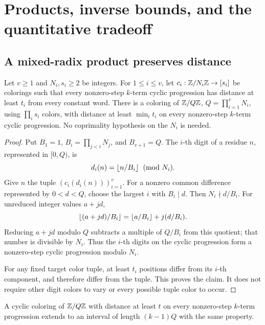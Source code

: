 \section{Products, inverse bounds, and the quantitative tradeoff}
\label{sec:consequences}

\subsection{A mixed-radix product preserves distance}

\begin{proposition}\label{prop:product}
Let \(v\ge1\) and \(N_i,s_i\ge2\) be integers.
For \(1\le i\le v\), let \(c_i:\mathbb Z/N_i\mathbb Z\to[s_i]\) be colorings
such that every nonzero-step \(k\)-term cyclic progression has
distance at least \(t_i\) from every constant word.
There is a coloring of \(\mathbb Z/Q\mathbb Z\), \(Q=\prod_{i=1}^vN_i\),
using \(\prod_i s_i\) colors, with distance at least
\(\min_i t_i\) on every nonzero-step \(k\)-term cyclic progression.
No coprimality hypothesis on the \(N_i\) is needed.
\end{proposition}

\begin{proof}
Put \(B_1=1\), \(B_i=\prod_{j<i}N_j\), and \(B_{v+1}=Q\).
The \(i\)-th digit of a residue \(n\), represented in \([0,Q)\), is
\[
 d_i(n)=\left\lfloor n/B_i\right\rfloor\pmod{N_i}.
\]
Give \(n\) the tuple \((c_i(d_i(n)))_{i=1}^v\).
For a nonzero common difference represented by \(0<d<Q\), choose
the largest \(i\) with \(B_i\mid d\). Then \(N_i\nmid d/B_i\).
For unreduced integer values \(a+jd\),
\[
 \left\lfloor (a+jd)/B_i\right\rfloor=\left\lfloor a/B_i\right\rfloor+j(d/B_i).
\]
Reducing \(a+jd\) modulo \(Q\) subtracts a multiple of \(Q/B_i\)
from this quotient; that number is divisible by \(N_i\).
Thus the \(i\)-th digits on the cyclic progression form a
nonzero-step cyclic progression modulo \(N_i\).

For any fixed target color tuple, at least \(t_i\) positions differ
from its \(i\)-th component, and therefore differ from the tuple.
This proves the claim. It does not require other digit colors to
vary or every possible tuple color to occur.
\end{proof}

\begin{proposition}\label{prop:periodic}
A cyclic coloring of \(\mathbb Z/Q\mathbb Z\) with distance at least \(t\) on every
nonzero-step \(k\)-term progression extends to an interval of length
\((k-1)Q\) with the same property.
\end{proposition}

